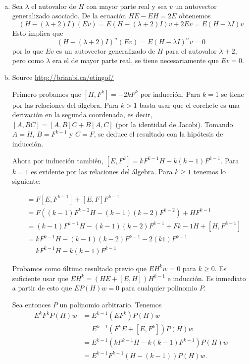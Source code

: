 \documentclass[twoside]{article}
\begin{document}
\begin{solucion}\
\begin{enumerate}[(a)]
\item Sea $\lambda$ el autovalor de $H$ con mayor parte real y sea $v$ un autovector generalizado asociado. De la ecuación $HE-EH=2E$ obtenemos 
\[
(H - (\lambda + 2)I)(Ev) = E(H - (\lambda + 2)I)v + 2Ev = E(H - \lambda I)v
\]
Esto implica que 
\[
(H - (\lambda + 2)I)^n (Ev) = E(H - \lambda I)^n v=0
\]
por lo que $Ev$ es un autovector generalizado de $H$ para el autovalor $\lambda+2$, pero como $\lambda$ era el de mayor parte real, se tiene necesariamente que $Ev=0$. 

\item Source \url{http://brianbi.ca/etingof/}

Primero probamos que $[H,F^k]=-2kF^k$ por inducción. Para $k=1$ se tiene por las relaciones del álgebra. Para $k>1$ basta usar que el corchete es una derivación en la segunda coordenada, es decir, $[A,BC]=[A,B]C+B[A,C]$ (por la identidad de Jacobi). Tomando $A=H$, $B=F^{k-1}$ y $C=F$, se deduce el resultado con la hipótesis de inducción. 

Ahora por inducción también, $[E,F^k]=kF^{k-1}H-k(k-1)F^{k-1}$. Para $k=1$ es evidente por las relaciones del álgebra. Para $k\geq 1$ tenemos lo siguiente:

\begin{align*}
[E,F^k]&=F[E,F^{k-1}]+[E,F]F^{k-1}\\
&=F((k-1)F^{k-2}H-(k-1)(k-2)F^{k-2})+HF^{k-1}\\
&=(k-1)F^{k-1}H-(k-1)(k-2)F^{k-1}+F{k-1}H+[H,F^{k-1}]\\
&=kF^{k-1}H-(k-1)(k-2)F^{k-1}-2(k1)F^{k-1}\\
&=kF^{k-1}H-k(k-1)F^{k-1}
\end{align*}

Probamos como último resultado previo que $EH^kw=0$ para $k\geq 0$. Es suficiente usar que $EH^k=(HE+[E,H])H^{k-1}$ e inducción. Es inmediato a partir de esto que $EP(H)w=0$ para cualquier polinomio $P$. 

Sea entonces $P$ un polinomio arbitrario. Tenemos
\begin{align*}
E^kF^kP(H)w&=E^{k-1}(EF^k)P(H)w\\
&=E^{k-1}(F^kE+[E,F^k])P(H)w\\
&=E^{k-1}(kF^{k-1}H-k(k-1)F^{k-1})P(H)w\\
&=E^{k-1}F^{k-1}(H-(k-1))P(H)w.
\end{align*}


\end{enumerate}
\end{solucion}
\end{document}
